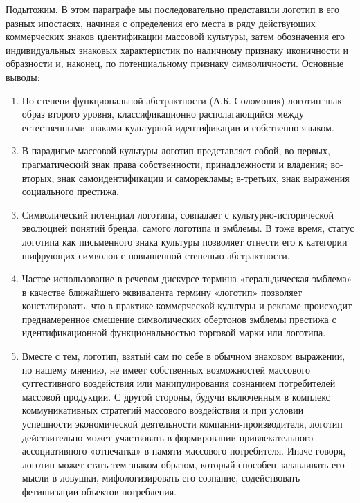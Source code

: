 Подытожим.
В этом параграфе мы последовательно представили логотип в его разных ипостасях,
  начиная с определения его места в ряду действующих коммерческих знаков идентификации массовой культуры,
  затем обозначения его индивидуальных знаковых характеристик по наличному признаку
  иконичности и образности и, наконец, по потенциальному признаку символичности. Основные выводы:
\begin{enumerate}
\item По степени функциональной абстрактности (А.Б. Соломоник) логотип знак-образ второго уровня, классификационно располагающийся между естественными знаками культурной идентификации и собственно языком.
\item В парадигме массовой культуры логотип представляет собой, во-первых, прагматический знак права собственности, принадлежности и владения; во-вторых, знак самоидентификации и саморекламы; в-третьих, знак выражения социального престижа. 
\item Символический потенциал логотипа, совпадает с культурно-исторической эволюцией понятий бренда, самого логотипа и эмблемы. В тоже время, статус логотипа как письменного знака культуры позволяет отнести его к категории шифрующих символов с повышенной степенью абстрактности.
\item Частое использование в речевом дискурсе термина «геральдическая эмблема» в качестве ближайшего эквивалента термину «логотип»  позволяет констатировать, что в практике коммерческой культуры и рекламе  происходит преднамеренное смешение символических обертонов эмблемы престижа с идентификационной функциональностью торговой марки или логотипа.  
\item Вместе с тем, логотип, взятый сам по себе в обычном знаковом выражении, по нашему мнению, не имеет собственных возможностей массового суггестивного воздействия или манипулирования сознанием потребителей массовой продукции. С другой стороны, будучи включенным в комплекс коммуникативных стратегий массового воздействия и при условии успешности экономической деятельности компании-производителя, логотип действительно может участвовать в формировании привлекательного ассоциативного «отпечатка» в памяти массового потребителя. Иначе говоря, логотип может стать тем знаком-образом, который способен залавливать его мысли в ловушки, мифологизировать его сознание, содействовать фетишизации объектов потребления.
\end{enumerate}

